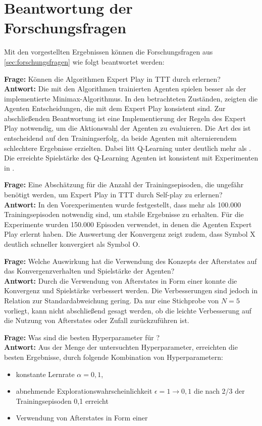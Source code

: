 \section{Beantwortung der Forschungsfragen}
Mit den vorgestellten Ergebnissen können die Forschungsfragen aus \cref{sec:forschungsfragen} wie folgt beantwortet werden:

\textbf{Frage:} Können die Algorithmen Expert Play in \acl{TTT} durch \splay erlernen? \\ \textbf{Antwort:} Die mit den Algorithmen trainierten Agenten spielen besser als der implementierte Minimax-Algorithmus. In den betrachteten Zuständen, zeigten die Agenten Entscheidungen, die mit dem Expert Play konsistent sind. Zur abschließenden Beantwortung ist eine Implementierung der Regeln des Expert Play notwendig, um die Aktionswahl der Agenten zu evaluieren. Die Art des \splay ist entscheidend auf den Trainingserfolg, da beide Agenten mit alternierendem \splay schlechtere Ergebnisse erzielten. Dabei litt Q-Learning unter \splay deutlich mehr als \sarsa. Die erreichte Spielstärke des Q-Learning Agenten ist konsistent mit Experimenten in \cite{mirnovi.QLearningTicTacToe2020}.

\textbf{Frage:} Eine Abschätzung für die Anzahl der Trainingsepisoden, die  ungefähr benötigt werden, um Expert Play in \ac{TTT} durch Self-play zu erlernen? \\ \textbf{Antwort:} In den Vorexperimenten wurde festgestellt, dass mehr als 100.000 Trainingsepisoden notwendig sind, um stabile Ergebnisse zu erhalten. Für die Experimente wurden 150.000 Episoden verwendet, in denen die Agenten Expert Play erlernt haben. Die Auswertung der Konvergenz zeigt zudem, dass Symbol X deutlich schneller konvergiert als Symbol O.

\textbf{Frage:} Welche Auswirkung hat die Verwendung des Konzepts der Afterstates auf das Konvergenzverhalten und Spielstärke der Agenten? \\ \textbf{Antwort:} Durch die Verwendung von Afterstates in Form einer \wtable konnte die Konvergenz und Spielstärke verbessert werden. Die Verbesserungen sind jedoch in Relation zur Standardabweichung gering. Da nur eine Stichprobe von $N=5$ vorliegt, kann nicht abschließend gesagt werden, ob die leichte Verbesserung auf die Nutzung von Afterstates oder Zufall zurückzuführen ist. 

\textbf{Frage:} Was sind die besten Hyperparameter für \bothAlgs? \\ \textbf{Antwort:} Aus der Menge der untersuchten Hyperparameter, erreichten \bothAlgs die besten Ergebnisse, durch folgende Kombination von Hyperparametern:
\begin{itemize}
    \item konstante Lernrate $\alpha=0,1$, 
    \item abnehmende Explorationswahrscheinlichkeit $\epsilon = 1 \rightarrow 0,1$ die nach 2/3 der Trainingsepisoden 0,1 erreicht
    \item Verwendung von Afterstates in Form einer \wtable
\end{itemize}

